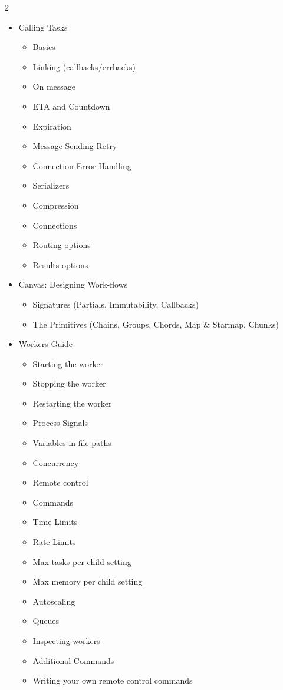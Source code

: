 \documentclass [8pt] {extarticle}
\begin{document}
\begin {multicols} {2}
\begin {itemize}
\begin {itemize}
\item Calling Tasks

    \begin {itemize}
        \item Basics
        \item Linking (callbacks/errbacks)
        \item On message
        \item ETA and Countdown
        \item Expiration
        \item Message Sending Retry
        \item Connection Error Handling
        \item Serializers
        \item Compression
        \item Connections
        \item Routing options
        \item Results options
    \end {itemize}

\item Canvas: Designing Work-flows

    \begin {itemize}
\item Signatures (Partials, Immutability, Callbacks)
\item The Primitives (Chains, Groups, Chords, Map \& Starmap, Chunks)
    \end {itemize}

\item Workers Guide

    \begin {itemize}
        \item Starting the worker
        \item Stopping the worker
        \item Restarting the worker
        \item Process Signals
        \item Variables in file paths
        \item Concurrency
        \item Remote control
        \item Commands
        \item Time Limits
        \item Rate Limits
        \item Max tasks per child setting
        \item Max memory per child setting
        \item Autoscaling
        \item Queues
        \item Inspecting workers
        \item Additional Commands
        \item Writing your own remote control commands
    \end {itemize}


\end{itemize}
\end{itemize}
\end{multicols}
\end{document}
